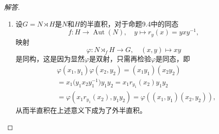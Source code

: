 \begin{enumerate}
\begin{proof}[解答]
\begin{enumerate}[label=(\arabic*)]
\begin{align*}
        =\big(x_1f_{y_1}(x_2f_{y_2}(x_3)),y_1y_2y_3\big).
    \end{align*}
    \item 设$G=N \rtimes H$是$N$和$H$的半直积，对于命题9.4中的同态
    \[f:H\to\operatorname{Aut}(N), \quad y \mapsto r_y(x)=yxy^{-1},\]
    映射
    \[\varphi:N\rtimes_fH \to G,\quad(x,y) \mapsto xy\]
    是同构，这是因为显然$\varphi$是双射，只需再检验$\varphi$是同态，即
    \begin{align*}
        &\varphi(x_1,y_1)\varphi(x_2,y_2)=(x_1y_1)(x_2y_2)\\
        &=x_1\big(y_1x_2y_1^{-1}\big)y_1y_2=x_1r_{y_1}(x_2)y_1y_2\\
        &=\varphi(x_1r_{y_1}(x_2),y_1y_2)=\varphi((x_1,y_1)(x_2,y_2)),
    \end{align*}
    从而半直积在上述意义下成为了外半直积。
    

\end{enumerate}
\end{proof}
\end{enumerate}
